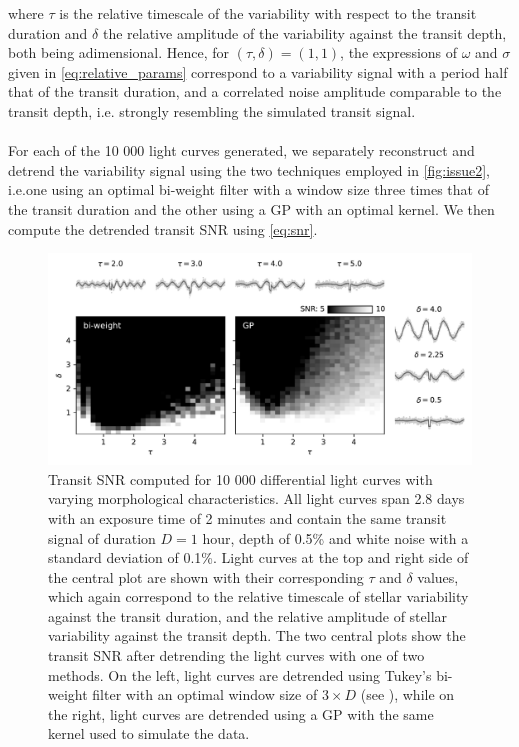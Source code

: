 \documentclass[modern]{aastex631}
\begin{document}
where $\tau$ is the relative timescale of the variability with respect to the transit duration and $\delta$ the relative amplitude of the variability against the transit depth, both being adimensional. Hence, for $(\tau, \delta)=(1, 1)$, the expressions of $\omega$ and $\sigma$ given in \autoref{eq:relative_params} correspond to a variability signal with a period half that of the transit duration, and a correlated noise amplitude comparable to the transit depth, i.e. strongly resembling the simulated transit signal.\\\\
For each of the 10 000 light curves generated, we separately reconstruct and detrend the variability signal using the two techniques employed in \autoref{fig:issue2}, i.e.\;one using an optimal bi-weight filter with a window size three times that of the transit duration \citep{wotan} and the other using a GP with an optimal kernel. We then compute the detrended transit SNR using \autoref{eq:snr}.
\begin{figure}[H]
    \begin{centering}
        \includegraphics[width=\linewidth]{./result.pdf}
        \caption{Transit SNR computed for 10 000 differential light curves with varying morphological characteristics. All light curves span 2.8 days with an exposure time of 2 minutes and contain the same transit signal of  duration $D=1$ hour, depth of 0.5\% and white noise with a standard deviation of 0.1\%. Light curves at the top and right side of the central plot are shown with their corresponding $\tau$ and $\delta$ values, which again correspond to the relative timescale of stellar variability against the transit duration, and the relative amplitude of stellar variability against the transit depth. The two central plots show the transit SNR after detrending the light curves with one of two methods. On the left, light curves are detrended using Tukey's bi-weight filter with an optimal window size of $3\times D$ (see \citealt{wotan}), while on the right, light curves are detrended using a GP with the same kernel used to simulate the data. }
        \label{fig:snr_detrend}
    \end{centering}
\end{figure}
\end{document}
